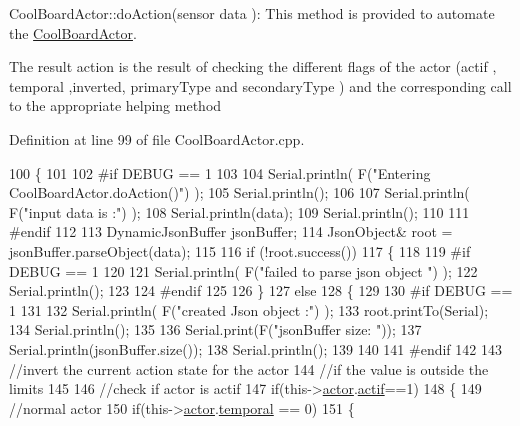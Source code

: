 Cool\+Board\+Actor\+::do\+Action(sensor data )\+: This method is provided to automate the \hyperlink{class_cool_board_actor}{Cool\+Board\+Actor}.

The result action is the result of checking the different flags of the actor (actif , temporal ,inverted, primary\+Type and secondary\+Type ) and the corresponding call to the appropriate helping method 

Definition at line 99 of file Cool\+Board\+Actor.\+cpp.


\begin{DoxyCode}
100 \{
101 
102 \textcolor{preprocessor}{#if DEBUG == 1 }
103 
104     Serial.println( F(\textcolor{stringliteral}{"Entering CoolBoardActor.doAction()"}) );
105     Serial.println();
106 
107     Serial.println( F(\textcolor{stringliteral}{"input data is :"}) );
108     Serial.println(data);
109     Serial.println();
110 
111 \textcolor{preprocessor}{#endif }
112 
113     DynamicJsonBuffer jsonBuffer;
114     JsonObject& root = jsonBuffer.parseObject(data);
115     
116     \textcolor{keywordflow}{if} (!root.success()) 
117     \{
118     
119 \textcolor{preprocessor}{    #if DEBUG == 1 }
120 
121         Serial.println( F(\textcolor{stringliteral}{"failed to parse json object "}) );
122         Serial.println();
123     
124 \textcolor{preprocessor}{    #endif }
125 
126     \}
127     \textcolor{keywordflow}{else}
128     \{
129     
130 \textcolor{preprocessor}{    #if DEBUG == 1 }
131 
132         Serial.println( F(\textcolor{stringliteral}{"created Json object :"}) );
133         root.printTo(Serial);
134         Serial.println();
135 
136         Serial.print(F(\textcolor{stringliteral}{"jsonBuffer size: "}));
137         Serial.println(jsonBuffer.size());
138         Serial.println();
139 
140     
141 \textcolor{preprocessor}{    #endif }
142 
143         \textcolor{comment}{//invert the current action state for the actor}
144         \textcolor{comment}{//if the value is outside the limits}
145         
146         \textcolor{comment}{//check if actor is actif}
147         \textcolor{keywordflow}{if}(this->\hyperlink{class_cool_board_actor_a8f190db9f7a39fddbcef7f152da970e9}{actor}.\hyperlink{struct_cool_board_actor_1_1state_a7963178c2de01ef0d2861f9f59ad6f3c}{actif}==1)
148         \{
149             \textcolor{comment}{//normal actor}
150             \textcolor{keywordflow}{if}(this->\hyperlink{class_cool_board_actor_a8f190db9f7a39fddbcef7f152da970e9}{actor}.\hyperlink{struct_cool_board_actor_1_1state_a6442a8c3a30abc48472f3e5284b786ea}{temporal} == 0)
151             \{

\end{DoxyCode}
